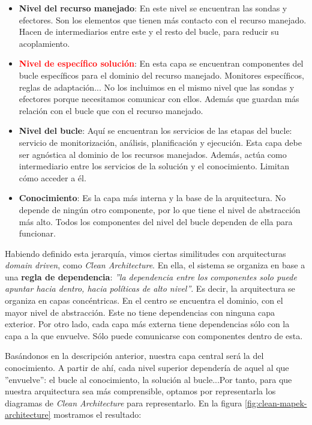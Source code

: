 \begin{itemize}
  \item \textbf{Nivel del recurso manejado}: En este nivel se encuentran las sondas y efectores. Son los elementos que tienen más contacto con el recurso manejado. Hacen de intermediarios entre este y el resto del bucle, para reducir su acoplamiento.

  \item \textbf{\textcolor{red}{Nivel de específico solución}}: En esta capa se encuentran componentes del bucle específicos para el dominio del recurso manejado. Monitores específicos, reglas de adaptación... No los incluimos en el mismo nivel que las sondas y efectores porque necesitamos comunicar con ellos. Además que guardan más relación con el bucle que con el recurso manejado.

  \item \textbf{Nivel del bucle}: Aquí se encuentran los servicios de las etapas del bucle: servicio de monitorización, análisis, planificación y ejecución. Esta capa debe ser agnóstica al dominio de los recursos manejados. Además, actúa como intermediario entre los servicios de la solución y el conocimiento. Limitan cómo acceder a él.

  \item \textbf{Conocimiento}: Es la capa más interna y la base de la arquitectura. No depende de ningún otro componente, por lo que tiene el nivel de abstracción más alto. Todos los componentes del nivel del bucle dependen de ella para funcionar.

\end{itemize}

Habiendo definido esta jerarquía, vimos ciertas similitudes con arquitecturas \emph{domain driven}, como \emph{Clean Architecture}. \cite{martinChapter22Clean2018} En ella, el sistema se organiza en base a una \textbf{regla de dependencia}: \emph{''la dependencia entre los componentes solo puede apuntar hacia dentro, hacia políticas de alto nivel''}. Es decir, la arquitectura se organiza en capas concéntricas. En el centro se encuentra el dominio, con el mayor nivel de abstracción. Este no tiene dependencias con ninguna capa exterior. Por otro lado, cada capa más externa tiene dependencias sólo con la capa a la que envuelve. Sólo puede comunicarse con componentes dentro de esta.

Basándonos en la descripción anterior, nuestra capa central será la del conocimiento. A partir de ahí, cada nivel superior dependería de aquel al que ''envuelve'': el bucle al conocimiento, la solución al bucle...Por tanto, para que nuestra arquitectura sea más comprensible, optamos por representarla los diagramas de \emph{Clean Architecture} para representarlo. En la figura \ref{fig:clean-mapek-architecture} mostramos el resultado:

